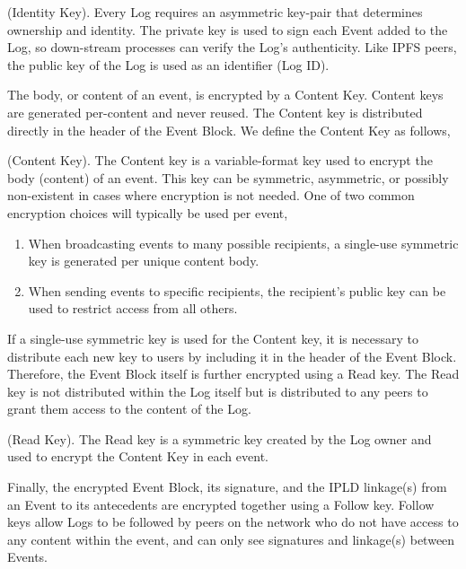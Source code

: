 \documentclass{comjnl}
\begin{document}
\begin{definition}
(Identity Key). Every Log requires an asymmetric key-pair that determines ownership and identity. The private key is used to sign each Event added to the Log, so down-stream processes can verify the Log’s authenticity. Like IPFS peers, the public key of the Log is used as an identifier (Log ID).
\end{definition}

The body, or content of an event, is encrypted by a Content Key. Content keys are generated per-content and never reused. The Content key is distributed directly in the header of the Event Block. We define the Content Key as follows,

\begin{definition}
(Content Key). The Content key is a variable-format key used to encrypt the body (content) of an event. This key can be symmetric, asymmetric, or possibly non-existent in cases where encryption is not needed. One of two common encryption choices will typically be used per event, 
\begin{enumerate}
\item \label{Perf1}When broadcasting events to many possible recipients, a single-use symmetric key is generated per unique content body.
\item \label{Perf2}When sending events to specific recipients, the recipient's public key can be used to restrict access from all others.
\end{enumerate}
\end{definition}

If a single-use symmetric key is used for the Content key, it is necessary to distribute each new key to users by including it in the header of the Event Block. Therefore, the Event Block itself is further encrypted using a Read key. The Read key is not distributed within the Log itself but is distributed to any peers to grant them access to the content of the Log. 

\begin{definition}
 (Read Key). The Read key is a symmetric key created by the Log owner and used to encrypt the Content Key in each event.
\end{definition}

Finally, the encrypted Event Block, its signature, and the IPLD linkage(s) from an Event to its antecedents are encrypted together using a Follow key. Follow keys allow Logs to be followed by peers on the network who do not have access to any content within the event, and can only see signatures and linkage(s) between Events.
\end{document}
